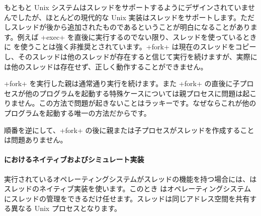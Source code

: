 もともと Unix システムはスレッドをサポートするようにデザインされていませんでしたが、ほとんどの現代的な Unix 実装はスレッドをサポートします。ただしスレッドが後から追加されたものであるということが明白になることがあります。例えば \ml+exec+ を直後に実行するのでない限り、スレッドを使っているときに  を使うことは強く非推奨とされています。\ml+fork+ は現在のスレッドをコピーし、そのスレッドは他のスレッドが存在すると信じて実行を続けますが、実際には他のスレッドは存在せず、正しく動作することができません。

\ml+fork+ を実行した親は通常通り実行を続けます。また \ml+fork+ の直後に子プロセスが他のプログラムを起動する特殊ケースについては親プロセスに問題は起こりません。この方法で問題が起きないことはラッキーです。なぜならこれが他のプログラムを起動する唯一の方法だからです。

順番を逆にして、\ml+fork+ の後に親または子プロセスがスレッドを作成することは問題ありません。

\paragraph {\label{sec/thread-implementation} {\ocaml} におけるネイティブおよびシミュレート実装}

実行されているオペレーティングシステムがスレッドの機能を持つ場合には、\ocaml はスレッドのネイティブ実装を使います。このとき \ocaml はオペレーティングシステムにスレッドの管理をできるだけ任せます。スレッドは同じアドレス空間を共有する異なる Unix プロセスとなります。

